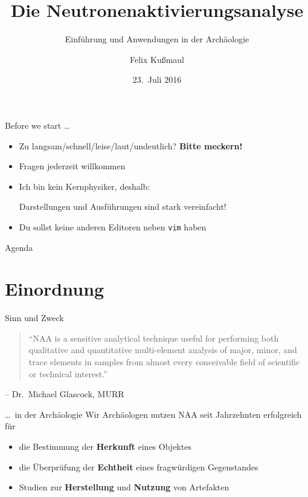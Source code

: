 \documentclass[xcolor=dvipsnames, aspectratio=169]{beamer}
\author[Felix Kußmaul]{\large Felix Kußmaul}
\title[NAA]{\Large Die Neutronenaktivierungsanalyse}
\subtitle{Einführung und Anwendungen in der Archäologie}
\institute[UzK]{Seminar zu naturwissenschaftlichen Untersuchungsmethoden\\ von Fundkeramik und ihrer archäologischen Interpretation\\[.5em] Universität zu Köln}
\date[23.\ Juli 2016]{23.\ Juli 2016}
\begin{document}
\maketitle

\begin{frame}[<+->]{Before we start \dots}
\begin{itemize}
\item Zu langsam/schnell/leise/laut/undeutlich? \textbf{Bitte meckern!}
\item Fragen \alert{jederzeit} willkommen
\item Ich bin kein Kernphysiker, deshalb:

Darstellungen und Ausführungen sind stark vereinfacht!
\item Du sollst keine anderen Editoren neben \texttt{vim} haben
\end{itemize}
\end{frame}

\begin{frame}{Agenda}
       \tableofcontents[ 
  		subsectionstyle=show, 
   	 	sectionstyle=show, 
   	 ] 
\end{frame}

\section{Einordnung}

\begin{frame}{Sinn und Zweck}
\begin{quote}
``NAA is a sensitive analytical technique useful for performing both qualitative and quantitative \alert{multi-element analysis} of major, minor, and trace elements in samples from almost every conceivable field of scientific or technical interest.''
\end{quote}
\vspace*{-2em}
\begin{flushright}
-- Dr.\ Michael Glascock, MURR
\end{flushright}
\end{frame}

\begin{frame}{\dots\ in der Archäologie}
Wir Archäologen nutzen NAA seit Jahrzehnten erfolgreich für
\begin{itemize}
\item die Bestimmung der \textbf{Herkunft} eines Objektes
\item die Überprüfung der \textbf{Echtheit} eines fragwürdigen Gegenstandes
\item Studien zur \textbf{Herstellung} und \textbf{Nutzung} von Artefakten
\end{itemize}
\end{frame}
\end{document}
